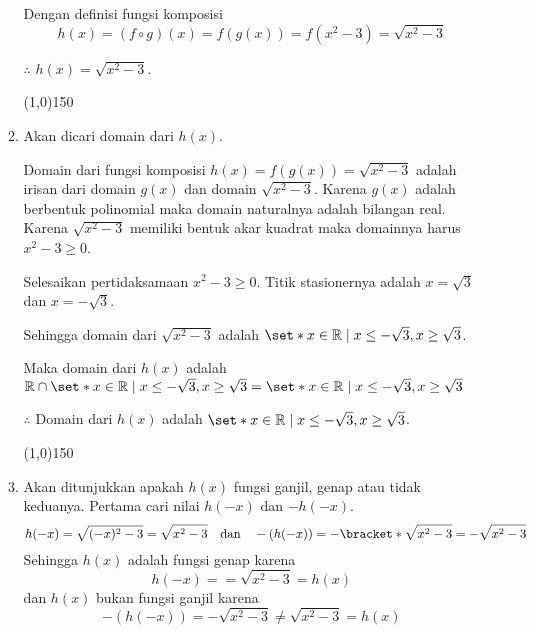 \begin{enumerate}[leftmargin=*, label={\arabic*}.]
\begin{enumerate}[label={\alph*}.]
    Dengan definisi fungsi komposisi
    \[
    h(x)=(f \circ g)(x)=f(g(x))=f(x^{2}-3) = \sqrt{x^{2}-3}
    \]

    $\therefore$ $h(x) = \sqrt{x^{2}-3}$.
\begin{center}
    \line(1,0){150}
\end{center}
    \item Akan dicari domain dari $h(x)$.
    
    Domain dari fungsi komposisi $h(x)=f(g(x))=\sqrt{x^{2}-3}$ adalah irisan 
    dari domain $g(x)$ dan domain $\sqrt{x^{2}-3}$. Karena $g(x)$ adalah berbentuk 
    polinomial maka domain naturalnya adalah bilangan real. Karena $\sqrt{x^{2}-3}$ 
    memiliki bentuk akar kuadrat maka domainnya harus $x^{2}-3 \geq 0$.
    
    Selesaikan pertidaksamaan $x^{2}-3 \geq 0$. Titik stasionernya adalah $x=\sqrt{3}$ 
    dan $x=-\sqrt{3}$.

    \begin{center}
    \end{center}
    Sehingga domain dari $\sqrt{x^{2}-3}$ adalah 
    $\set*{x \in \mathbb{R} \mid x \leq -\sqrt{3}, x \geq \sqrt{3}}$.

    Maka domain dari $h(x)$ adalah $\mathbb{R} \cap 
    \set*{x \in \mathbb{R} \mid x \leq -\sqrt{3}, x \geq \sqrt{3}} 
    = \set*{x \in \mathbb{R} \mid x \leq -\sqrt{3}, x \geq \sqrt{3}}$

    $\therefore$ Domain dari $h(x)$ adalah 
    $\set*{x \in \mathbb{R} \mid x \leq -\sqrt{3}, x \geq \sqrt{3}}$. 
\begin{center}
    \line(1,0){150}
\end{center}
    \item Akan ditunjukkan apakah $h(x)$ fungsi ganjil, genap atau tidak keduanya.
    Pertama cari nilai $h(-x)$ dan $-h(-x)$.
    \[
    h(-x) = \sqrt{(-x)^{2}-3} = \sqrt{x^{2}- 3} \quad \text{dan} \quad 
    -(h(-x)) = -\bracket*{\sqrt{x^{2}- 3}} = -\sqrt{x^{2}- 3}
    \]   
    Sehingga $h(x)$ adalah fungsi genap karena
    \[
        h(-x) =  = \sqrt{x^{2}- 3} = h(x)
    \]
    dan $h(x)$ bukan fungsi ganjil karena 
    \[
        -(h(-x)) = -\sqrt{x^{2}- 3} \neq \sqrt{x^{2}- 3} = h(x)
    \]


\end{enumerate}
\end{enumerate}
